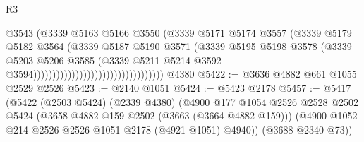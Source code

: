 \begin{lexlean}{R3}
\begin{coremodule}
                                                          @3543
                                                          (@3339
                                                            @5163
                                                            @5166
                                                            @3550
                                                            (@3339
                                                              @5171
                                                              @5174
                                                              @3557
                                                              (@3339
                                                                @5179
                                                                @5182
                                                                @3564
                                                                (@3339
                                                                  @5187
                                                                  @5190
                                                                  @3571
                                                                  (@3339
                                                                    @5195
                                                                    @5198
                                                                    @3578
                                                                    (@3339
                                                                      @5203
                                                                      @5206
                                                                      @3585
                                                                      (@3339
                                                                        @5211
                                                                        @5214
                                                                        @3592
                                                                        @3594))))))))))))))))))))))))))))))))))
    @4380
@5422 := @3636 @4882 @661 @1055 @2529 @2526
@5423 := @2140 @1051
@5424 := @5423 @2178
@5457 := @5417
    (@5422
      (@2503 @5424)
      (@2339 @4380)
      (@4900
        @177
        @1054
        @2526
        @2528
        @2502
        @5424
        (@3658 @4882 @159 @2502 (@3663 (@3664 @4882 @159)))
        (@4900 @1052 @214 @2526 @2526 @1051 @2178 (@4921 @1051) @4940))
      (@3688 @2340 @73))

\end{coremodule}
\end{lexlean}
